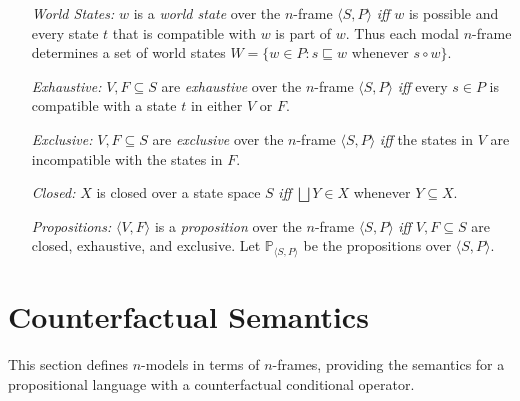 \documentclass[a4paper, 11pt]{article} %
\newcommand{\tuple}[1]{\langle#1\rangle} %
\newcommand{\set}[1]{\lbrace#1\rbrace} %
\renewcommand{\P}[0]{\mathbb{P}}
\begin{document}
\begin{enumerate}
  \item[\it World States:] $w$ is a \textit{world state} over the $n$-frame $\tuple{S,P}$ \textit{iff} $w$ is possible and every state $t$ that is compatible with $w$ is part of $w$. 
    Thus each modal $n$-frame determines a set of world states $W=\set{w\in P: s\sqsubseteq w \text{ whenever } s\circ w}$.
  \item[\it Exhaustive:] $V,F\subseteq S$ are \textit{exhaustive} over the $n$-frame $\tuple{S,P}$ \textit{iff} every $s\in P$ is compatible with a state $t$ in either $V$ or $F$.
  \item[\it Exclusive:] $V,F\subseteq S$ are \textit{exclusive} over the $n$-frame $\tuple{S,P}$ \textit{iff} the states in $V$ are incompatible with the states in $F$.
  \item[\it Closed:] $X$ is closed over a state space $S$ \textit{iff} $\bigsqcup Y\in X$ whenever $Y\subseteq X$.
  \item[\it Propositions:] $\tuple{V,F}$ is a \textit{proposition} over the $n$-frame $\tuple{S,P}$ \textit{iff} $V,F\subseteq S$ are closed, exhaustive, and exclusive.
    Let $\P_{\tuple{S,P}}$ be the propositions over $\tuple{S,P}$.
\end{enumerate}




\section{Counterfactual Semantics}

This section defines $n$-models in terms of $n$-frames, providing the semantics for a propositional language with a counterfactual conditional operator.
\end{document}
